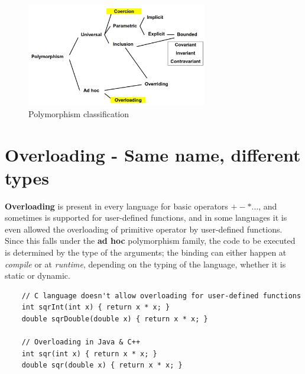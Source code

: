 \begin{figure}[h]
    \centering
    \includegraphics[width=0.7\textwidth]{images/polymorphism.png}
    \caption{Polymorphism classification}
    \label{fig:polymorphism_classification}
\end{figure}
\section{Overloading - Same name, different types}
\textbf{Overloading} is present in every language for basic operators $+-*...$,
and sometimes is supported for user-defined functions, 
and in some languages it is even allowed the overloading of primitive operator by user-defined functions.\\
Since this falls under the \textbf{ad hoc} polymorphism family,
the code to be executed is determined by the type of the arguments;
the binding can either happen at \textit{compile} or at \textit{runtime},
depending on the typing of the language,
whether it is static or dynamic.

\begin{lstlisting}
    // C language doesn't allow overloading for user-defined functions
    int sqrInt(int x) { return x * x; }
    double sqrDouble(double x) { return x * x; }
    
    // Overloading in Java & C++
    int sqr(int x) { return x * x; }
    double sqr(double x) { return x * x; }
\end{lstlisting}

